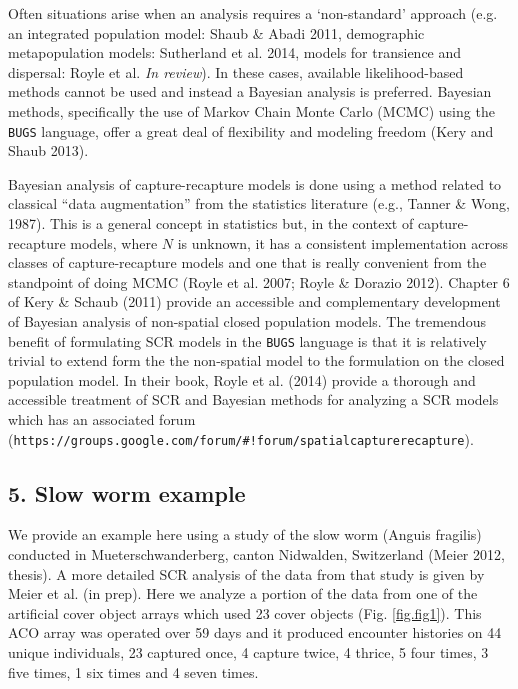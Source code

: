 \documentclass{book}
\begin{document}
Often situations arise when an analysis requires a `non-standard' approach (e.g. an integrated population model: Shaub \& Abadi 2011, demographic metapopulation models: Sutherland et al. 2014, models for transience and dispersal: Royle et al. {\it In review}). In these cases, available likelihood-based methods cannot be used and instead a Bayesian analysis is preferred. Bayesian methods, specifically the use of Markov Chain Monte Carlo (MCMC) using the {\tt BUGS} language, offer a great deal of flexibility and modeling freedom (Kery and Shaub 2013).

Bayesian analysis of capture-recapture models is done using a method related to classical ``data augmentation'' from the statistics literature (e.g., Tanner \& Wong, 1987).  This is a general concept in statistics but, in the context of capture-recapture models, where $N$ is unknown, it has a consistent implementation across classes of capture-recapture models and one that is really convenient from the standpoint of doing MCMC (Royle et al. 2007; Royle \& Dorazio 2012). Chapter 6 of Kery \& Schaub (2011) provide an accessible and complementary development of Bayesian analysis of non-spatial closed population models. The tremendous benefit of formulating SCR models in the {\tt BUGS} language is that it is relatively trivial to extend form the the non-spatial model to the formulation on the closed population model. In their book, Royle et al. (2014) provide a thorough and accessible treatment of SCR and Bayesian methods for analyzing a SCR models which has an associated forum (\verb|https://groups.google.com/forum/#!forum/spatialcapturerecapture|).

\subsection*{5. Slow worm example}

We provide an example here using a study of the slow worm (Anguis
fragilis) conducted in Mueterschwanderberg, canton Nidwalden, Switzerland (Meier
2012, thesis). A more detailed SCR analysis of the data from that
study is given by Meier et al. (in prep). Here we analyze a portion of
the data from one of the artificial cover object arrays which used 23
cover objects (Fig. \ref{fig.fig1}). This ACO array was operated over 59 days and it
produced encounter histories on 44 unique individuals, 23 captured
once, 4 capture twice, 4 thrice, 5 four times, 3 five times, 1 six
times and 4 seven times.
\end{document}
